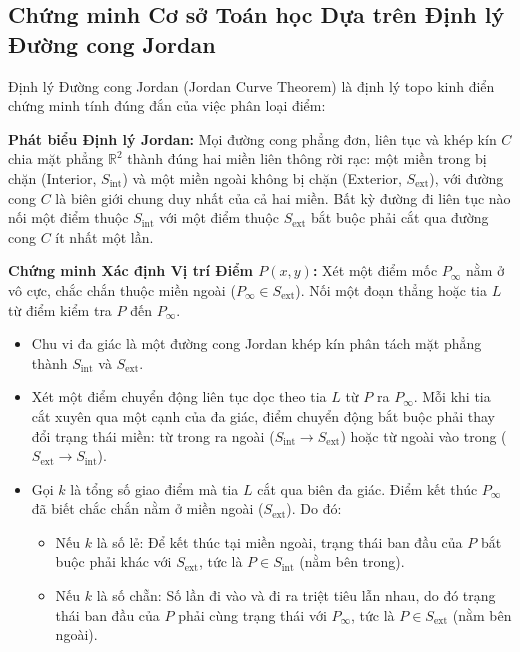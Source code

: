 \subsection{Chứng minh Cơ sở Toán học Dựa trên Định lý Đường cong Jordan}

Định lý Đường cong Jordan (Jordan Curve Theorem) là định lý topo kinh điển chứng minh tính đúng đắn của việc phân loại điểm:

\textbf{Phát biểu Định lý Jordan:}
Mọi đường cong phẳng đơn, liên tục và khép kín $C$ chia mặt phẳng $\mathbb{R}^2$ thành đúng hai miền liên thông rời rạc: một miền trong bị chặn (Interior, $S_{\text{int}}$) và một miền ngoài không bị chặn (Exterior, $S_{\text{ext}}$), với đường cong $C$ là biên giới chung duy nhất của cả hai miền. Bất kỳ đường đi liên tục nào nối một điểm thuộc $S_{\text{int}}$ với một điểm thuộc $S_{\text{ext}}$ bắt buộc phải cắt qua đường cong $C$ ít nhất một lần.

\textbf{Chứng minh Xác định Vị trí Điểm $P(x, y)$:}
Xét một điểm mốc $P_\infty$ nằm ở vô cực, chắc chắn thuộc miền ngoài ($P_\infty \in S_{\text{ext}}$). Nối một đoạn thẳng hoặc tia $L$ từ điểm kiểm tra $P$ đến $P_\infty$.
\begin{itemize}
    \item Chu vi đa giác là một đường cong Jordan khép kín phân tách mặt phẳng thành $S_{\text{int}}$ và $S_{\text{ext}}$.
    \item Xét một điểm chuyển động liên tục dọc theo tia $L$ từ $P$ ra $P_\infty$. Mỗi khi tia cắt xuyên qua một cạnh của đa giác, điểm chuyển động bắt buộc phải thay đổi trạng thái miền: từ trong ra ngoài ($S_{\text{int}} \to S_{\text{ext}}$) hoặc từ ngoài vào trong ($S_{\text{ext}} \to S_{\text{int}}$).
    \item Gọi $k$ là tổng số giao điểm mà tia $L$ cắt qua biên đa giác. Điểm kết thúc $P_\infty$ đã biết chắc chắn nằm ở miền ngoài ($S_{\text{ext}}$). Do đó:
    \begin{itemize}
        \item Nếu $k$ là số lẻ: Để kết thúc tại miền ngoài, trạng thái ban đầu của $P$ bắt buộc phải khác với $S_{\text{ext}}$, tức là $P \in S_{\text{int}}$ (nằm bên trong).
        \item Nếu $k$ là số chẵn: Số lần đi vào và đi ra triệt tiêu lẫn nhau, do đó trạng thái ban đầu của $P$ phải cùng trạng thái với $P_\infty$, tức là $P \in S_{\text{ext}}$ (nằm bên ngoài).
    \end{itemize}
\end{itemize}

